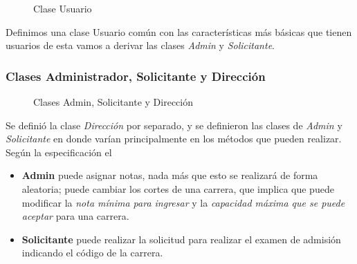 \documentclass[12pt,a4paper]{article}
\begin{document}
\begin{figure}
  \caption{Clase Usuario}
  \label{fig:mi_etiqueta}
\end{figure}

Definimos una clase Usuario común con las características más básicas que tienen usuarios de esta vamos a derivar las clases \textit{Admin} y \textit{Solicitante}. 

\newpage

\subsubsection*{Clases Administrador, Solicitante y Dirección}

\begin{figure}[H]
  \centering
  \caption{Clases Admin, Solicitante y Dirección}
  \label{fig:ClaseAdminSoliDir}
\end{figure}

Se definió la clase \textit{Dirección} por separado, y se definieron las clases de \textit{Admin} y \textit{Solicitante} en donde varían principalmente en los métodos que pueden realizar. Según la especificación el
\begin{itemize}
  \item \textbf{Admin} puede asignar notas, nada más que esto se realizará de forma aleatoria; puede cambiar los cortes de una carrera, que implica que puede modificar la \textit{nota mínima para ingresar} y la \textit{capacidad máxima que se puede aceptar} para una carrera.
  \item \textbf{Solicitante} puede realizar la solicitud para realizar el examen de admisión indicando el código de la carrera.
\end{itemize}
\end{document}
